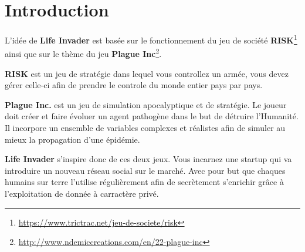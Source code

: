 \chapter*{Introduction}
\label{chap:introduction}

L'idée de \textbf{Life Invader} est basée sur le fonctionnement du jeu de société \textbf{RISK}\footnote{\url{https://www.trictrac.net/jeu-de-societe/risk}} ainsi que sur le thème du jeu \textbf{Plague Inc}\footnote{\url{http://www.ndemiccreations.com/en/22-plague-inc}}.

\textbf{RISK} est un jeu de stratégie dans lequel vous controllez un armée, vous devez gérer celle-ci afin de prendre le controle du monde entier pays par pays.

\textbf{Plague Inc.} est un jeu de simulation apocalyptique et de stratégie. Le joueur doit créer et faire évoluer un agent pathogène dans le but de détruire l'Humanité. 
Il incorpore un ensemble de variables complexes et réalistes afin de simuler au mieux la propagation d'une épidémie.

\textbf{Life Invader} s'inspire donc de ces deux jeux. Vous incarnez une startup qui va introduire un nouveau réseau social sur le marché. Avec pour but que chaques humains sur terre l'utilise régulièrement afin de secrètement s'enrichir grâce à l'exploitation de donnée à carractère privé.

